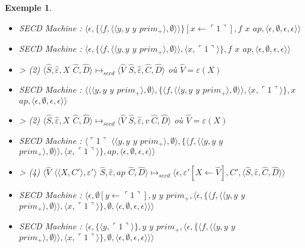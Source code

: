 \documentclass[10pt,a4paper]{report}
\newtheorem{ex}{Exemple}
\begin{document}
\begin{ex}
\begin{itemize}
			\item[] SECD Machine : $\langle\epsilon,\{\langle f,\langle\langle y,y$ $y$ $prim_{+}\rangle,\emptyset\rangle\rangle\}[x \leftarrow \ulcorner 1\urcorner],f$ $x$ $ap,\langle\epsilon,\emptyset,\epsilon,\epsilon\rangle\rangle$
			\item[] SECD Machine : $\langle\epsilon,\{\langle f,\langle\langle y,y$ $y$ $prim_{+}\rangle,\emptyset\rangle\rangle,\langle x,\ulcorner 1\urcorner\rangle\},f$ $x$ $ap,\langle\epsilon,\emptyset,\epsilon,\epsilon\rangle\rangle$
			\item[] > (2) $\langle\widehat{S},\widehat{\varepsilon},X$ $\widehat{C},\widehat{D}\rangle \longmapsto_{secd} \langle \widehat{V}$ $\widehat{S},\widehat{\varepsilon},\widehat{C},\widehat{D}\rangle$ où $\widehat{V} = \varepsilon(X)$
			\item[] SECD Machine : $\langle\langle\langle y,y$ $y$ $prim_{+}\rangle,\emptyset\rangle,\{\langle f,\langle\langle y,y$ $y$ $prim_{+}\rangle,\emptyset\rangle\rangle,\langle x,\ulcorner 1\urcorner\rangle\},x$ $ap,\langle\epsilon,\emptyset,\epsilon,\epsilon\rangle\rangle$
			\item[] > (2) $\langle\widehat{S},\widehat{\varepsilon},X$ $\widehat{C},\widehat{D}\rangle \longmapsto_{secd} \langle \widehat{V}$ $\widehat{S},\widehat{\varepsilon},v~
			\widehat{C},\widehat{D}\rangle$ où $\widehat{V} = \varepsilon(X)$
			\item[] SECD Machine : $\langle\ulcorner 1\urcorner$ $\langle\langle y,y$ $y$ $prim_{+}\rangle,\emptyset\rangle,\{\langle f,\langle\langle y,y$ $y$ $prim_{+}\rangle,\emptyset\rangle\rangle,\langle x,\ulcorner 1\urcorner\rangle\},ap,\langle\epsilon,\emptyset,\epsilon,\epsilon\rangle\rangle$
			\item[] > (4) $\langle\widehat{V}$ $\langle\langle X,C'\rangle,\varepsilon'\rangle$ $\widehat{S},\widehat{\varepsilon},ap$ $\widehat{C},\widehat{D}\rangle \longmapsto_{secd} \langle\epsilon,\varepsilon'[X \leftarrow \widehat{V}],C',\langle\widehat{S},\widehat{\varepsilon},\widehat{C},\widehat{D}\rangle\rangle$
			\item[] SECD Machine :	$\langle\epsilon,\emptyset[y \leftarrow \ulcorner 1\urcorner],y$ $y$ $prim_{+},\langle\epsilon,\{\langle f,\langle\langle y,y$ $y$ $prim_{+}\rangle,\emptyset\rangle\rangle,\langle x,\ulcorner 1\urcorner\rangle\} ,\emptyset,\langle\epsilon,\emptyset,\epsilon,\epsilon\rangle\rangle\rangle$
			\item[] SECD Machine : $\langle\epsilon,\{\langle y,\ulcorner 1\urcorner\rangle\},y$ $y$ $prim_{+},\langle\epsilon,\{\langle f,\langle\langle y,y$ $y$ $prim_{+}\rangle,\emptyset\rangle\rangle,\langle x,\ulcorner 1\urcorner\rangle\} ,\emptyset,\langle\epsilon,\emptyset,\epsilon,\epsilon\rangle\rangle\rangle$

\end{itemize}
\end{ex}
\end{document}
